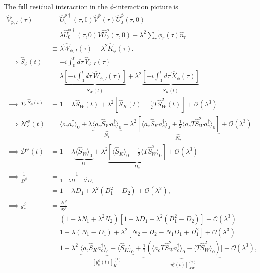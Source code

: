The full residual interaction in the $\phi$-interaction picture is
\begin{align}
    \hat V_{\phi,I}(\tau)
    &=
    \hat U_0^{\phi\dagger}(\tau,0)
    \hat V^\phi(\tau)
    \hat U_0^\phi(\tau,0)
    \nonumber\\
    &=
    \lambda
    \hat U_0^{\phi\dagger}(\tau,0)
    \hat V
    \hat U_0^\phi(\tau,0)
    -
    \lambda^2
    \sum_r
    \dot{\phi}_r(\tau)\hat n_r
    \nonumber\\
    &\equiv
    \lambda\hat W_{\phi,I}(\tau)
    -
    \lambda^2\hat K_\phi(\tau).
    \label{eq:Vphi_WK}\\
\implies    \hat S_\phi(t)
    &=
    -i\int_0^t d\tau\,
    \hat V_{\phi,I}(\tau)
    \nonumber\\
    &=
    \lambda
    \underbrace{
    \left[
    -i\int_0^t d\tau\,
    \hat W_{\phi,I}(\tau)
    \right]
    }_{\hat S_W(t)}
    +
    \lambda^2
    \underbrace{
    \left[
    +i\int_0^t d\tau\,
    \hat K_\phi(\tau)
    \right]
    }_{\hat S_K(t)}\\
\implies    T e^{\hat S_\phi(t)}
    &=
    1
    +
    \lambda\hat S_W(t)
    +
    \lambda^2
    \left[
        \hat S_K(t)
        +
        \frac{1}{2}
        T\hat S_W^2(t)
    \right]
    +
    \mathcal O(\lambda^3)\\
\implies
    \mathcal N_c^\phi(t)
    &=
    \langle
    a_c a_c^\dagger
    \rangle_0
    +
    \lambda \underbrace{
    \langle
    a_c\hat S_W a_c^\dagger
    \rangle_0}_{N_1}+
    \lambda^2 \underbrace{
    \left[
        \langle
        a_c\hat S_K a_c^\dagger
        \rangle_0
        +
        \frac{1}{2}
        \langle
        a_c T\hat S_W^2 a_c^\dagger
        \rangle_0
    \right]}_{N_2}
    +
    \mathcal O(\lambda^3)\\
\implies
    \mathcal D^\phi(t)
    &=
    1
    +
    \lambda \underbrace{
        \langle\hat S_W\rangle_0
    }_{D_1}+
    \lambda^2 \underbrace{
    \left[
        \langle\hat S_K\rangle_0
        +
        \frac{1}{2}
        \langle T\hat S_W^2\rangle_0
    \right]}_{D_2}
    +
    \mathcal O(\lambda^3)\\
\implies \frac{1}{\mathcal D^\phi}
&=
\frac{1}{
1+\lambda D_1+\lambda^2D_2
}
\nonumber\\
&=
1-\lambda D_1
+\lambda^2\left(D_1^2-D_2\right)
+\mathcal O(\lambda^3),
\\[1mm]
\implies y_c^\phi
&=
\frac{\mathcal N_c^\phi}{\mathcal D^\phi}
\nonumber\\
&=
\left(
1+\lambda N_1+\lambda^2N_2
\right)
\left[
1-\lambda D_1
+\lambda^2(D_1^2-D_2)
\right]
+\mathcal O(\lambda^3)
\nonumber\\
&=
1
+\lambda(N_1-D_1)
+\lambda^2
\left[
N_2-D_2-N_1D_1+D_1^2
\right]
+\mathcal O(\lambda^3)
\nonumber\\
&=
1+\lambda^2
\Bigg[\underbrace{{
\langle a_c\hat S_Ka_c^\dagger\rangle_0
-\langle\hat S_K\rangle_0
}}_{\left[ y_c^\phi(t)\right]_{K}^{(1)}}
+
\underbrace{\frac{1}{2}
{
\left(
\langle a_cT\hat S_W^2a_c^\dagger\rangle_0
-\langle T\hat S_W^2\rangle_0
\right)
}}_{\left[y_c^\phi(t)\right]_{WW}^{(2)}}
\Bigg]
+\mathcal O(\lambda^3),
\end{align}
